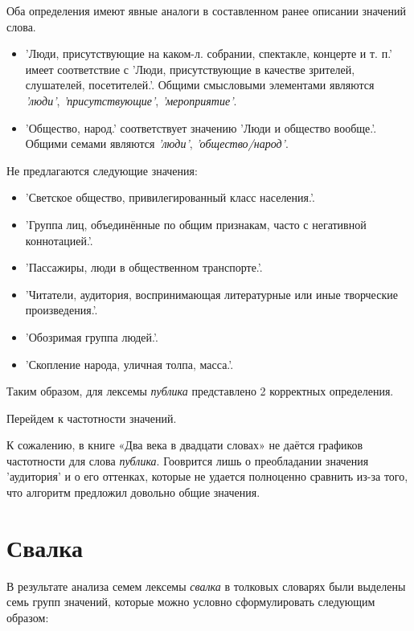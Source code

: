 Оба определения имеют явные аналоги в составленном ранее описании значений слова.

\begin{itemize}
    \item ’Люди, присутствующие на каком-л. собрании, спектакле, концерте и т. п.’ имеет соответствие с
    ’Люди, присутствующие в качестве зрителей, слушателей, посетителей.’.
    Общими смысловыми элементами являются \textit{’люди’}, \textit{’присутствующие’}, \textit{’мероприятие’}.

    \item ’Общество, народ.’ соответствует значению ’Люди и общество вообще.’.
    Общими семами являются \textit{’люди’}, \textit{’общество/народ’}.
\end{itemize}

Не предлагаются следующие значения:
\begin{itemize}
    \item ’Светское общество, привилегированный класс населения.’.
    \item ’Группа лиц, объединённые по общим признакам, часто с негативной коннотацией.’.
    \item ’Пассажиры, люди в общественном транспорте.’.
    \item ’Читатели, аудитория, воспринимающая литературные или иные творческие произведения.’.
    \item ’Обозримая группа людей.’.
    \item ’Скопление народа, уличная толпа, масса.’.
\end{itemize}

Таким образом, для лексемы \textit{публика} представлено 2 корректных определения.

Перейдем к частотности значений.

К сожалению, в книге «Два века в двадцати словах» не даётся
графиков частотности для слова \textit{публика}.
Гооврится лишь о преобладании значения ’аудитория’ и о его оттенках,
которые не удается полноценно сравнить из-за того, что алгоритм предложил довольно общие значения.

\section*{Свалка}

В результате анализа семем лексемы \textit{свалка} в толковых словарях были
выделены семь групп значений, которые можно условно сформулировать
следующим образом:

